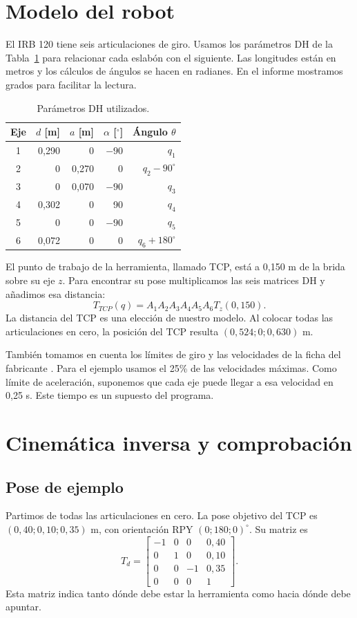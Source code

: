 \documentclass[conference]{IEEEtran}
\begin{document}
\section{Modelo del robot}
El IRB 120 tiene seis articulaciones de giro. Usamos los parámetros DH de la Tabla~\ref{tab:dh} para relacionar cada eslabón con el siguiente. Las longitudes están en metros y los cálculos de ángulos se hacen en radianes. En el informe mostramos grados para facilitar la lectura.
\begin{table}[!b]
\caption{Parámetros DH utilizados.}\label{tab:dh}\centering
\begin{tabular}{crrrr}\hline
Eje & $d$ [m] & $a$ [m] & $\alpha$ [$^\circ$] & Ángulo $\theta$\\\hline
1 & 0,290 & 0 & $-90$ & $q_1$\\
2 & 0 & 0,270 & 0 & $q_2-90^\circ$\\
3 & 0 & 0,070 & $-90$ & $q_3$\\
4 & 0,302 & 0 & 90 & $q_4$\\
5 & 0 & 0 & $-90$ & $q_5$\\
6 & 0,072 & 0 & 0 & $q_6+180^\circ$\\\hline
\end{tabular}
\end{table}

El punto de trabajo de la herramienta, llamado TCP, está a 0,150 m de la brida sobre su eje $z$. Para encontrar su pose multiplicamos las seis matrices DH y añadimos esa distancia:
\begin{equation}
T_{TCP}(q)=A_1A_2A_3A_4A_5A_6T_z(0{,}150).
\end{equation}
La distancia del TCP es una elección de nuestro modelo. Al colocar todas las articulaciones en cero, la posición del TCP resulta $(0{,}524;0;0{,}630)$ m.

También tomamos en cuenta los límites de giro y las velocidades de la ficha del fabricante \cite{abb}. Para el ejemplo usamos el 25\% de las velocidades máximas. Como límite de aceleración, suponemos que cada eje puede llegar a esa velocidad en 0,25 s. Este tiempo es un supuesto del programa.

\section{Cinemática inversa y comprobación}
\subsection{Pose de ejemplo}
Partimos de todas las articulaciones en cero. La pose objetivo del TCP es $(0{,}40;0{,}10;0{,}35)$ m, con orientación RPY $(0;180;0)^\circ$. Su matriz es
\begin{equation}
T_d=\begin{bmatrix}
-1&0&0&0{,}40\\
0&1&0&0{,}10\\
0&0&-1&0{,}35\\
0&0&0&1
\end{bmatrix}.
\end{equation}
Esta matriz indica tanto dónde debe estar la herramienta como hacia dónde debe apuntar.
\end{document}
